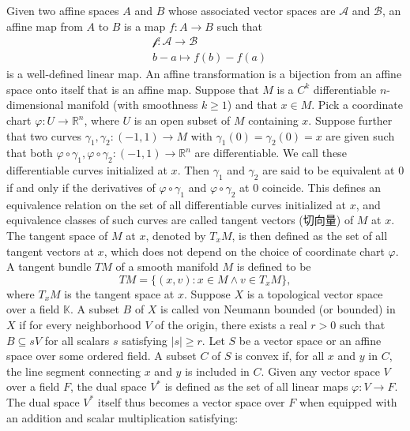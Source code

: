 \documentclass[a4paper,12pt]{article}
\begin{document}
Given two affine spaces $A$ and $B$ whose associated vector spaces are $\mathscr{A}$ and $\mathscr{B}$, an affine map from $A$ to $B$ is a map $f\colon A\to B$ such that
\[\begin{aligned}
&\mathscr{f}\colon\mathscr{A}\to\mathscr{B}\\
&b-a\mapsto f(b)-f(a)
\end{aligned}\]
is a well-defined linear map.
An affine transformation is a bijection from an affine space onto itself that is an affine map.
Suppose that $M$ is a $C^k$ differentiable $n$-dimensional manifold (with smoothness $k\geq 1$) and that $x\in M$. Pick a coordinate chart $\varphi\colon U\to\mathbb{R}^n$, where $U$ is an open subset of $M$ containing $x$. Suppose further that two curves $\gamma_1,\gamma_2\colon (-1,1)\to M$ with $\gamma_1(0)=\gamma_2(0)=x$ are given such that both $\varphi\circ\gamma_1,\varphi\circ\gamma_2\colon (-1,1)\to\mathbb{R}^n$ are differentiable. We call these differentiable curves initialized at $x$. Then $\gamma_1$ and $\gamma_2$ are said to be equivalent at $0$ if and only if the derivatives of $\varphi\circ\gamma_1$ and $\varphi\circ\gamma_2$ at $0$ coincide. This defines an equivalence relation on the set of all differentiable curves initialized at $x$, and equivalence classes of such curves are called tangent vectors (切向量) of $M$ at $x$. The tangent space of $M$ at $x$, denoted by $T_xM$, is then defined as the set of all tangent vectors at $x$, which does not depend on the choice of coordinate chart $\varphi$.
A tangent bundle $TM$ of a smooth manifold $M$ is defined to be
\[TM=\{(x,v)\colon x\in M\land v\in T_xM\},\]
where $T_xM$ is the tangent space at $x$.
Suppose $X$ is a topological vector space over a field $\mathbb{K}$. A subset $B$ of $X$ is called von Neumann bounded (or bounded) in $X$ if for every neighborhood $V$ of the origin, there exists a real $r>0$ such that $B\subseteq sV$ for all scalars $s$ satisfying $|s|\geq r$.
Let $S$ be a vector space or an affine space over some ordered field. A subset $C$ of $S$ is convex if, for all $x$ and $y$ in $C$, the line segment connecting $x$ and $y$ is included in $C$.
Given any vector space $V$ over a field $F$, the dual space $V^*$ is defined as the set of all linear maps $\varphi\colon V\to F$. The dual space $V^*$ itself thus becomes a vector space over $F$ when equipped with an addition and scalar multiplication satisfying:
\end{document}
